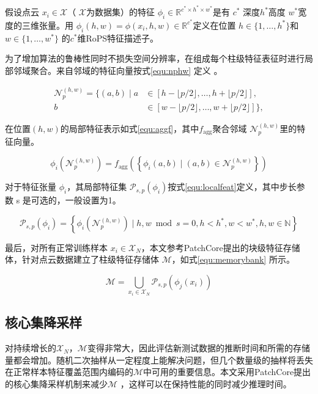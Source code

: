 假设点云 $x_{i} \in \mathcal{X}$（ $\mathcal{X}$为数据集）的特征 $\phi_{i} \in \mathbb{R}^{c^{*} \times h^{*} \times w^{*}}$是有 $c^{*}$ 深度$h^{*}$高度 $w^{*}$宽度的三维张量。用 $\phi_{i}(h, w)=\phi\left(x_{i}, h, w\right) \in \mathbb{R}^{c^{*}}$定义在位置 $h \in \{1,…,h^{*}\}$和 $w \in \{1,…,w^{*} \}$ 的$c^{*}$维RoPS特征描述子。

为了增加算法的鲁棒性同时不损失空间分辨率，在组成每个柱级特征表征时进行局部邻域聚合。来自邻域的特征向量按式\ref{equ:nphw} 定义 。

\begin{equation}\label{equ:nphw}
    \begin{aligned}\mathcal{N}_{p}^{(h, w)}=\{(a, b) \mid a & \in[h-\lfloor p / 2\rfloor, \ldots, h+\lfloor p / 2\rfloor], \\b & \in[w-\lfloor p / 2\rfloor, \ldots, w+\lfloor p / 2\rfloor]\},\end{aligned}
\end{equation}


在位置$(h,w)$的局部特征表示如式\ref{equ:aggf}，其中$f_{\mathrm{agg}}$聚合邻域 $\mathcal{N}_{p}^{(h, w)}$里的特征向量。

\begin{equation}\label{equ:aggf}
    \phi_{i}\left(\mathcal{N}_{p}^{(h, w)}\right)=f_{\mathrm{agg}}\left(\left\{\phi_{i}(a, b) \mid(a, b) \in \mathcal{N}_{p}^{(h, w)}\right\}\right)
\end{equation}

对于特征张量 $\phi_{i}$，其局部特征集 $\mathcal{P}_{s, p}\left(\phi_{i}\right)$按式\ref{equ:localfeat}定义，其中步长参数 s 是可选的，一般设置为1。

\begin{equation}\label{equ:localfeat}
    \mathcal{P}_{s, p}\left(\phi_{i}\right)=\left\{\phi_{i}\left(\mathcal{N}_{p}^{(h, w)}\right) \mid\right.
 \left.h, w \bmod s=0, h<h^{*}, w<w^{*}, h, w \in \mathbb{N}\right\} 
\end{equation}

最后，对所有正常训练样本 $x_{i} \in \mathcal{X}_{N}$，本文参考PatchCore提出的块级特征存储体，针对点云数据建立了柱级特征存储体 $\mathcal{M}$，如式\ref{equ:memorybank} 所示。

\begin{equation}\label{equ:memorybank}
    \mathcal{M}=\bigcup_{x_{i} \in \mathcal{X}_{N}} \mathcal{P}_{s, p}\left(\phi_{j}\left(x_{i}\right)\right)
\end{equation}

\subsection{核心集降采样}
对持续增长的$\mathcal{X}_{N}$，$\mathcal{M}$变得非常大，因此评估新测试数据的推断时间和所需的存储量都会增加。随机二次抽样从一定程度上能解决问题，但几个数量级的抽样将丢失在正常样本特征覆盖范围内编码的$\mathcal{M}$中可用的重要信息。本文采用PatchCore提出的核心集降采样机制来减少$\mathcal{M}$ ，这样可以在保持性能的同时减少推理时间。

